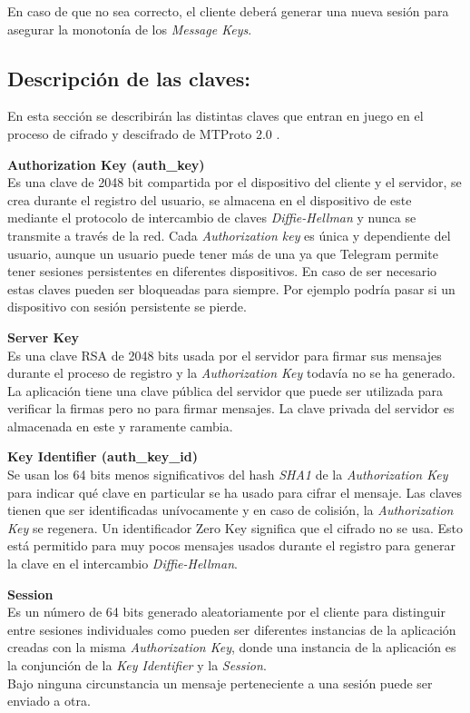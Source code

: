 En caso de que no sea correcto, el cliente deberá generar una nueva sesión para asegurar la monotonía de los \emph{Message Keys}.

\subsection{Descripción de las claves:}
En esta sección se describirán las distintas claves que entran en juego en el proceso de cifrado y descifrado de MTProto 2.0 \cite{telegram2}.

\begin{description}
	\item \textbf{Authorization Key (auth\_key)}\\
	Es una clave de 2048 bit compartida por el dispositivo del cliente y el servidor, se crea durante el registro del usuario, se almacena en el dispositivo de este mediante el protocolo de intercambio de claves \emph{Diffie-Hellman} y nunca se transmite a través de la red. Cada \emph{Authorization key} es única y dependiente del usuario, aunque un usuario puede tener más de una ya que Telegram permite tener sesiones persistentes en diferentes dispositivos. En caso de ser necesario estas claves pueden ser bloqueadas para siempre. Por ejemplo podría pasar si un dispositivo con sesión persistente se pierde.

	\item \textbf{Server Key}\\
	Es una clave RSA de 2048 bits usada por el servidor para firmar sus mensajes durante el proceso de registro y la \emph{Authorization Key} todavía no se ha generado. La aplicación tiene una clave pública del servidor que puede ser utilizada para verificar la firmas pero no para firmar mensajes. La clave privada del servidor es almacenada en este y raramente cambia.

	\item \textbf{Key Identifier (auth\_key\_id)}\\
	Se usan los 64 bits menos significativos del hash \emph{SHA1} de la \emph{Authorization Key} para indicar qué clave en particular se ha usado para cifrar el mensaje. Las claves tienen que ser identificadas unívocamente y en caso de colisión, la \emph{Authorization Key} se regenera. Un identificador Zero Key significa que el cifrado no se usa. Esto está permitido para muy pocos mensajes usados durante el registro para generar la clave en el intercambio \emph{Diffie-Hellman}.
	
	\item \textbf{Session}\\
	Es un número de 64 bits generado aleatoriamente por el cliente para distinguir entre sesiones individuales como pueden ser diferentes instancias de la aplicación creadas con la misma \emph{Authorization Key}, donde una instancia de la aplicación es la conjunción de la \emph{Key Identifier} y la \emph{Session}.\\
	Bajo ninguna circunstancia un mensaje perteneciente a una sesión puede ser enviado a otra.


\end{description}
